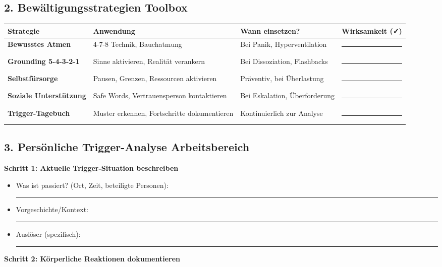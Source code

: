 {\hypertarget{bewaeltigungsstrategien-toolbox}{%
\subsection{2. Bewältigungsstrategien Toolbox}}\label{bewaeltigungsstrategien-toolbox}

\begin{center}
\begin{tabular}{|p{3cm}|p{4cm}|p{4cm}|p{3cm}|}
\hline
\textbf{Strategie} & \textbf{Anwendung} & \textbf{Wann einsetzen?} & \textbf{Wirksamkeit (✓)} \\
\hline
\textbf{Bewusstes Atmen} & 4-7-8 Technik, Bauchatmung & Bei Panik, Hyperventilation & \rule{1.5cm}{0.4pt} \\
\hline
\textbf{Grounding 5-4-3-2-1} & Sinne aktivieren, Realität verankern & Bei Dissoziation, Flashbacks & \rule{1.5cm}{0.4pt} \\
\hline
\textbf{Selbstfürsorge} & Pausen, Grenzen, Ressourcen aktivieren & Präventiv, bei Überlastung & \rule{1.5cm}{0.4pt} \\
\hline
\textbf{Soziale Unterstützung} & Safe Words, Vertrauensperson kontaktieren & Bei Eskalation, Überforderung & \rule{1.5cm}{0.4pt} \\
\hline
\textbf{Trigger-Tagebuch} & Muster erkennen, Fortschritte dokumentieren & Kontinuierlich zur Analyse & \rule{1.5cm}{0.4pt} \\
\hline
\end{tabular}
\end{center}

\hypertarget{persoenliche-trigger-analyse-arbeitsbereich}{%
\subsection{3. Persönliche Trigger-Analyse Arbeitsbereich}}\label{persoenliche-trigger-analyse-arbeitsbereich}

\textbf{Schritt 1: Aktuelle Trigger-Situation beschreiben}

\begin{itemize}
\tightlist
\item
  Was ist passiert? (Ort, Zeit, beteiligte Personen): \rule{8cm}{0.4pt}
\item
  Vorgeschichte/Kontext: \rule{8cm}{0.4pt}
\item
  Auslöser (spezifisch): \rule{8cm}{0.4pt}
\end{itemize}

\textbf{Schritt 2: Körperliche Reaktionen dokumentieren}

}
